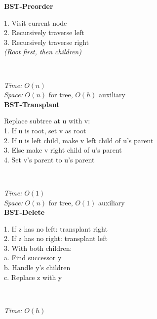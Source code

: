 \documentclass[a4paper]{extarticle}
\newcommand{\algofont}{\fontsize{4.3pt}{4.7pt}\selectfont}
\newcommand{\algocode}[1]{%
  \vspace{0pt}%
  \begin{algorithm}[H]
    \setlength{\abovecaptionskip}{0pt}%
    \setlength{\belowcaptionskip}{0pt}
    \setlength{\intextsep}{0pt}%
    \setlength{\textfloatsep}{0pt}
    \algofont  %
  \end{algorithm}%
  \vspace{0pt}%
}
\begin{document}
\begin{paracol}{3}
{\begin{minipage}[t]{1\linewidth}
\begin{minipage}[t]{0.5\linewidth}
       \textbf{BST-Preorder}\\
       \begin{minipage}[t]{\linewidth}
           1. Visit current node\\
           2. Recursively traverse left\\
           3. Recursively traverse right\\
           \textit{(Root first, then children)}
       \end{minipage}\\[-10px]
       \algocode{bst-preorder}\vspace*{-25px}
       \textit{Time:} \(O(n)\)\\
       \textit{Space:} \(O(n)\) for tree, \(O(h)\) auxiliary\\
       \textbf{BST-Transplant}\\
       \begin{minipage}[t]{\linewidth}
           Replace subtree at u with v:\\
           1. If u is root, set v as root\\
           2. If u is left child, make v left child of u's parent\\
           3. Else make v right child of u's parent\\
           4. Set v's parent to u's parent
       \end{minipage}\\[-10px]
       \algocode{bst-transplant}\vspace*{-25px}
       \textit{Time:} \(O(1)\)\\
       \textit{Space:} \(O(n)\) for tree, \(O(1)\) auxiliary\\
       \textbf{BST-Delete}\\
       \begin{minipage}[t]{\linewidth}
           1. If z has no left: transplant right\\
           2. If z has no right: transplant left\\
           3. With both children:\\
           \quad a. Find successor y\\
           \quad b. Handle y's children\\
           \quad c. Replace z with y
       \end{minipage}\\[-10px]
       \algocode{bst-delete}\vspace*{-25px}
       \textit{Time:} \(O(h)\)\\

\end{minipage}
\end{minipage}}
\end{paracol}
\end{document}
